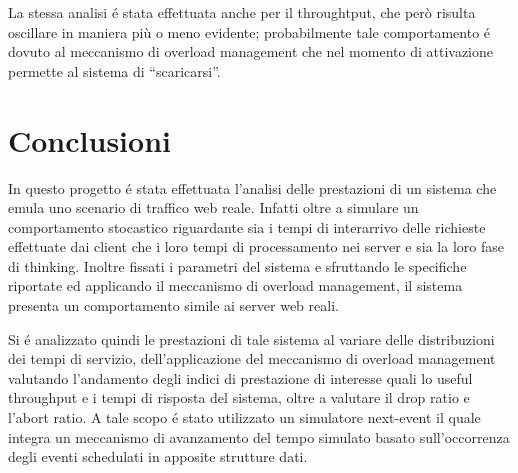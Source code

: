 La stessa analisi \'e stata effettuata anche per il throughtput, che per\`o risulta oscillare 
in maniera pi\`u o meno evidente; probabilmente tale comportamento \'e dovuto al meccanismo di
overload management che nel momento di attivazione permette al sistema di ``scaricarsi''.


\section{Conclusioni}

In questo progetto \'e stata effettuata l'analisi delle prestazioni di un 
sistema che emula uno scenario di traffico web reale.
Infatti oltre a simulare un comportamento stocastico riguardante sia i tempi di 
interarrivo delle 
richieste effettuate dai client che i loro tempi di processamento nei server e 
sia la loro fase di thinking. Inoltre fissati i parametri del sistema e 
sfruttando le specifiche riportate ed applicando il meccanismo di 
overload management, il sistema presenta un comportamento simile ai server web 
reali. 

Si \'e analizzato quindi le prestazioni di tale sistema al variare delle 
distribuzioni dei tempi di 
servizio, dell'applicazione del meccanismo di overload management valutando 
l'andamento 
degli indici di prestazione di interesse quali lo useful throughput e i tempi di 
risposta del 
sistema, oltre a valutare il drop ratio e l'abort ratio. A tale scopo \'e stato 
utilizzato un 
simulatore next-event il quale integra un meccanismo di avanzamento del tempo 
simulato 
basato sull'occorrenza degli eventi schedulati in apposite strutture dati.
